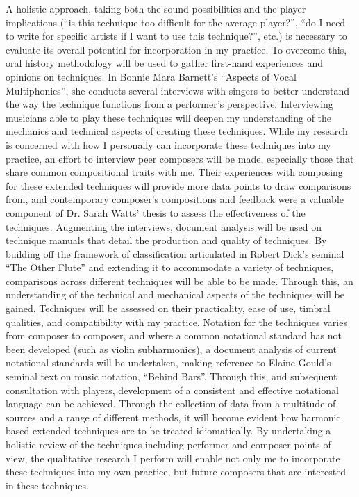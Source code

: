 A holistic approach, taking both the sound possibilities and the player implications (“is this technique too difficult for the average player?”, “do I need to write for specific artists if I want to use this technique?”, etc.) is necessary to evaluate its overall potential for incorporation in my practice. To overcome this, oral history methodology will be used to gather first-hand experiences and opinions on techniques. In Bonnie Mara Barnett’s “Aspects of Vocal Multiphonics”, she conducts several interviews with singers to better understand the way the technique functions from a performer’s perspective.\cite{barnettAspectsVocalMultiphonics1977} Interviewing musicians able to play these techniques will deepen my understanding of the mechanics and technical aspects of creating these techniques. While my research is concerned with how I personally can incorporate these techniques into my practice, an effort to interview peer composers will be made, especially those that share common compositional traits with me. Their experiences with composing for these extended techniques will provide more data points to draw comparisons from, and contemporary composer’s compositions and feedback were a valuable component of Dr. Sarah Watts’ thesis to assess the effectiveness of the techniques. 
Augmenting the interviews, document analysis will be used on technique manuals that detail the production and quality of techniques. By building off the framework of classification articulated in Robert Dick’s seminal “The Other Flute” and extending it to accommodate a variety of techniques, comparisons across different techniques will be able to be made.  Through this, an understanding of the technical and mechanical aspects of the techniques will be gained. Techniques will be assessed on their practicality, ease of use, timbral qualities, and compatibility with my practice. Notation for the techniques varies from composer to composer, and where a common notational standard has not been developed (such as violin subharmonics), a document analysis of current notational standards will be undertaken, making reference to Elaine Gould’s seminal text on music notation, “Behind Bars”.  Through this, and subsequent consultation with players, development of a consistent and effective notational language can be achieved.
Through the collection of data from a multitude of sources and a range of different methods, it will become evident how harmonic based extended techniques are to be treated idiomatically. By undertaking a holistic review of the techniques including performer and composer points of view, the qualitative research I perform will enable not only me to incorporate these techniques into my own practice, but future composers that are interested in these techniques.

